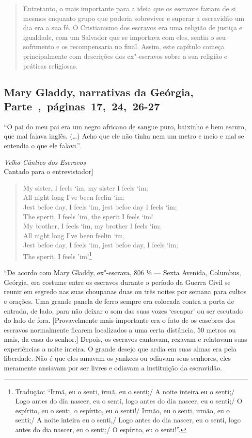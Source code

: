 \begin{quote}
Entretanto, o mais importante para a ideia que os escravos faziam
de si mesmos enquanto grupo que poderia sobreviver e superar a
escravidão um dia era a sua fé. O Cristianismo dos escravos era uma
religião de justiça e igualdade, com um Salvador que se importava com
eles, sentia o seu sofrimento e os recompensaria no final. Assim, este
capítulo começa principalmente com descrições dos ex"-escravos sobre a
sua religião e práticas religiosas.
\end{quote}

\subsection{Mary Gladdy, narrativas da Geórgia, Parte~,~páginas~17,~24,~26-27}
\label{ref106}

``O pai do meu pai era um negro africano de sangue puro, baixinho e bem
escuro, que mal falava inglês. (\ldots{}) Acho que ele não tinha nem um
metro e meio e mal se entendia o que ele falava''.


\noindent{}\emph{Velho Cântico dos Escravos}\\
\noindent{}{[}Cantado para o entrevistador{]}

\begin{verse}
My sister, I feels `im, my sister I feels `im;\\
All night long I've been feelin `im;\\
Jest befoe day, I feels `im, jest befoe day I \qb{}feels `im;\\
The sperit, I feels 'im, the sperit I feels `im!\\
My brother, I feels `im, my brother I feels `im;\\
All night long I've been feelin `im,\\
Jest befoe day, I feels `im, jest befoe day, I \qb{}feels `im;\\
The sperit, I feels 'im!\footnote{Tradução: ``Irmã, eu o senti,
irmã, eu o senti;/ A noite inteira eu o senti;/ Logo antes
do dia nascer, eu o senti, logo antes do dia nascer, eu o senti;/ O espírito, eu o
senti, o espírito, eu o senti!/ Irmão, eu o senti,
irmão, eu o senti;/ A noite inteira eu o senti,/ Logo antes
do dia nascer, eu o senti, logo antes do dia nascer, eu o senti;/ O espírito, eu o senti!''.}
\end{verse}

``De acordo com Mary Gladdy, ex"-escrava, 806 ½ --- Sexta Avenida,
Columbus, Geórgia, era costume entre os escravos durante o período da
Guerra Civil se reunir em segredo nas suas choupanas duas ou três noites
por semana para cultos e orações. Uma grande panela de ferro sempre era
colocada contra a porta de entrada, de lado, para não deixar o som das
suas vozes `escapar' ou ser escutado do lado de fora. {[}Provavelmente
mais importante era o fato de os casebres dos escravos normalmente
ficarem localizados a uma certa distância, 50 metros ou mais, da casa do
senhor.{]} Depois, os escravos cantavam, rezavam e relatavam suas
experiências a noite inteira. O grande desejo que ardia em suas almas
era pela liberdade. Não é que eles amavam os yankees ou odiavam seus
senhores, eles meramente ansiavam por ser livres e odiavam a instituição
da escravidão.

